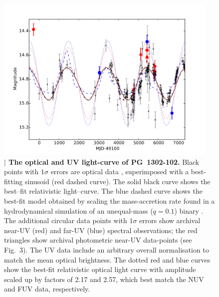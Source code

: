 
\begin{figure}
\centering
\includegraphics[width=0.95\textwidth]{figures/ch4/fig2_Type42.pdf}
\caption{{\bf $\mid$ The optical and UV light-curve of PG~1302-102.}
  Black points with $1\sigma$ errors are optical
  data \cite{Graham+2015a}, superimposed with a best-fitting sinusoid
  (red dashed curve). The solid black curve shows the best--fit
  relativistic light--curve. The blue dashed curve shows the best-fit
  model obtained by scaling the mass-accretion rate found in a
  hydrodynamical simulation of an unequal-mass ($q=0.1$)
  binary \cite{DHM:2013:MNRAS}.  The additional circular data points with
  $1\sigma$ errors show archival near-UV (red) and far-UV (blue)
  spectral observations; the red triangles show archival photometric
  near-UV data-points (see Fig.~3).  The UV data include an arbitrary
  overall normalisation to match the mean optical brightness.  The
  dotted red and blue curves show the best-fit relativistic optical
  light curve with amplitude scaled up by factors of 2.17 and 2.57,
  which best match the NUV and FUV data, respectively.}
\label{fig:lightcurve}
\end{figure}



